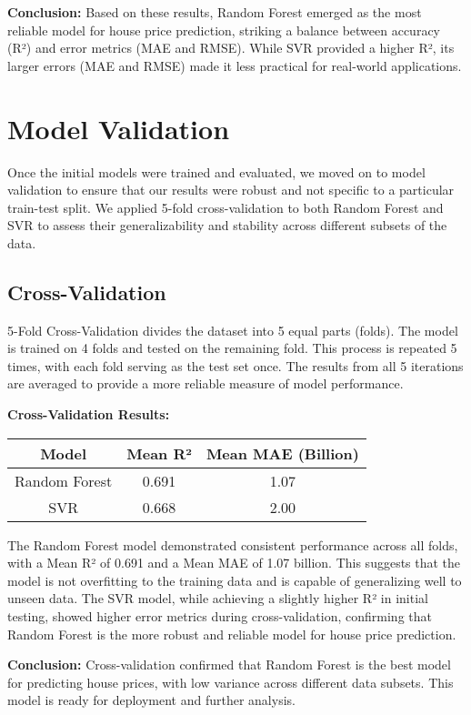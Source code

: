 \documentclass{article}
\begin{document}
\textbf{Conclusion:} Based on these results, Random Forest emerged as the most reliable model for house price prediction, striking a balance between accuracy (R²) and error metrics (MAE and RMSE). While SVR provided a higher R², its larger errors (MAE and RMSE) made it less practical for real-world applications.

\section{Model Validation}
Once the initial models were trained and evaluated, we moved on to model validation to ensure that our results were robust and not specific to a particular train-test split. We applied 5-fold cross-validation to both Random Forest and SVR to assess their generalizability and stability across different subsets of the data.

\subsection{Cross-Validation}
5-Fold Cross-Validation divides the dataset into 5 equal parts (folds). The model is trained on 4 folds and tested on the remaining fold. This process is repeated 5 times, with each fold serving as the test set once. The results from all 5 iterations are averaged to provide a more reliable measure of model performance.

\textbf{Cross-Validation Results:}
\begin{center}
\begin{tabular}{ccc}
\toprule
Model           & Mean R² & Mean MAE (Billion) \\ 
\midrule
Random Forest   & 0.691   & 1.07                \\ 
SVR             & 0.668   & 2.00                \\ 
\bottomrule
\end{tabular}
\end{center}

The Random Forest model demonstrated consistent performance across all folds, with a Mean R² of 0.691 and a Mean MAE of 1.07 billion. This suggests that the model is not overfitting to the training data and is capable of generalizing well to unseen data. The SVR model, while achieving a slightly higher R² in initial testing, showed higher error metrics during cross-validation, confirming that Random Forest is the more robust and reliable model for house price prediction.

\textbf{Conclusion:} Cross-validation confirmed that Random Forest is the best model for predicting house prices, with low variance across different data subsets. This model is ready for deployment and further analysis.
\end{document}
